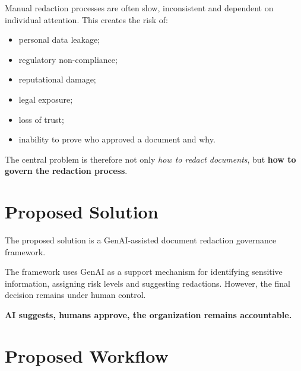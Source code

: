 \documentclass[12pt,a4paper]{article}
\begin{document}
Manual redaction processes are often slow, inconsistent and dependent on individual attention. This creates the risk of:

\begin{itemize}
    \item personal data leakage;
    \item regulatory non-compliance;
    \item reputational damage;
    \item legal exposure;
    \item loss of trust;
    \item inability to prove who approved a document and why.
\end{itemize}

\begin{principlebox}
The central problem is therefore not only \textit{how to redact documents}, but \textbf{how to govern the redaction process}.
\end{principlebox}

\section{Proposed Solution}

The proposed solution is a GenAI-assisted document redaction governance framework.

The framework uses GenAI as a support mechanism for identifying sensitive information, assigning risk levels and suggesting redactions. However, the final decision remains under human control.

\begin{principlebox}
\centering
\large\textbf{AI suggests, humans approve, the organization remains accountable.}
\end{principlebox}

\section{Proposed Workflow}
\end{document}
